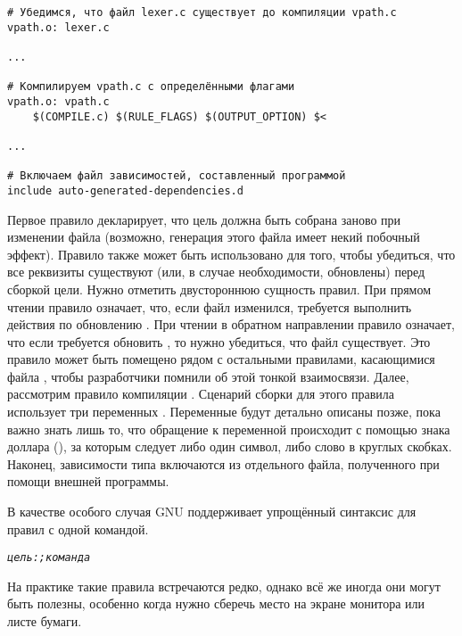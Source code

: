 {\footnotesize
\begin{verbatim}
# Убедимся, что файл lexer.c существует до компиляции vpath.c
vpath.o: lexer.c

...

# Компилируем vpath.c с определёнными флагами
vpath.o: vpath.c
	$(COMPILE.c) $(RULE_FLAGS) $(OUTPUT_OPTION) $<

...

# Включаем файл зависимостей, составленный программой
include auto-generated-dependencies.d
\end{verbatim}
}

Первое правило декларирует, что цель  должна быть
собрана заново при изменении файла  (возможно,
генерация этого файла имеет некий побочный эффект). Правило также
может быть использовано для того, чтобы убедиться, что все реквизиты
существуют (или, в случае необходимости, обновлены) перед сборкой
цели. Нужно отметить двустороннюю сущность правил. При прямом чтении
правило означает, что, если файл  изменился,
требуется выполнить действия по обновлению . При
чтении в обратном направлении правило означает, что если требуется
обновить , то нужно убедиться, что файл
 существует. Это правило может быть помещено рядом с
остальными правилами, касающимися файла , чтобы
разработчики помнили об этой тонкой взаимосвязи. Далее, рассмотрим
правило компиляции . Сценарий сборки для этого
правила использует три переменных \GNUmake{}. Переменные будут
детально описаны позже, пока важно знать лишь то, что обращение к
переменной происходит с помощью знака доллара (\command{\$}), за
которым следует либо один символ, либо слово в круглых скобках.
Наконец, зависимости типа  включаются из отдельного
файла, полученного при помощи внешней программы.

В качестве особого случая GNU \GNUmake{} поддерживает упрощённый
синтаксис для правил с одной командой.

{\footnotesize
\begin{alltt}
\emph{цель: ; команда}
\end{alltt}
}

На практике такие правила встречаются редко, однако всё же иногда они
могут быть полезны, особенно когда нужно сберечь место на экране
монитора или листе бумаги. 

